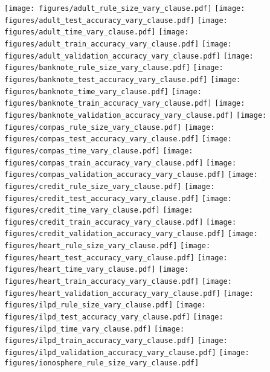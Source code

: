 \begin{figure*}[t]
\texttt{[image: figures/adult\_rule\_size\_vary\_clause.pdf]}
\texttt{[image: figures/adult\_test\_accuracy\_vary\_clause.pdf]}
\texttt{[image: figures/adult\_time\_vary\_clause.pdf]}
\texttt{[image: figures/adult\_train\_accuracy\_vary\_clause.pdf]}
\texttt{[image: figures/adult\_validation\_accuracy\_vary\_clause.pdf]}
\texttt{[image: figures/banknote\_rule\_size\_vary\_clause.pdf]}
\texttt{[image: figures/banknote\_test\_accuracy\_vary\_clause.pdf]}
\texttt{[image: figures/banknote\_time\_vary\_clause.pdf]}
\texttt{[image: figures/banknote\_train\_accuracy\_vary\_clause.pdf]}
\texttt{[image: figures/banknote\_validation\_accuracy\_vary\_clause.pdf]}
\texttt{[image: figures/compas\_rule\_size\_vary\_clause.pdf]}
\texttt{[image: figures/compas\_test\_accuracy\_vary\_clause.pdf]}
\texttt{[image: figures/compas\_time\_vary\_clause.pdf]}
\texttt{[image: figures/compas\_train\_accuracy\_vary\_clause.pdf]}
\texttt{[image: figures/compas\_validation\_accuracy\_vary\_clause.pdf]}
\texttt{[image: figures/credit\_rule\_size\_vary\_clause.pdf]}
\texttt{[image: figures/credit\_test\_accuracy\_vary\_clause.pdf]}
\texttt{[image: figures/credit\_time\_vary\_clause.pdf]}
\texttt{[image: figures/credit\_train\_accuracy\_vary\_clause.pdf]}
\texttt{[image: figures/credit\_validation\_accuracy\_vary\_clause.pdf]}
\texttt{[image: figures/heart\_rule\_size\_vary\_clause.pdf]}
\texttt{[image: figures/heart\_test\_accuracy\_vary\_clause.pdf]}
\texttt{[image: figures/heart\_time\_vary\_clause.pdf]}
\texttt{[image: figures/heart\_train\_accuracy\_vary\_clause.pdf]}
\texttt{[image: figures/heart\_validation\_accuracy\_vary\_clause.pdf]}
\texttt{[image: figures/ilpd\_rule\_size\_vary\_clause.pdf]}
\texttt{[image: figures/ilpd\_test\_accuracy\_vary\_clause.pdf]}
\texttt{[image: figures/ilpd\_time\_vary\_clause.pdf]}
\texttt{[image: figures/ilpd\_train\_accuracy\_vary\_clause.pdf]}
\texttt{[image: figures/ilpd\_validation\_accuracy\_vary\_clause.pdf]}
\texttt{[image: figures/ionosphere\_rule\_size\_vary\_clause.pdf]}

\end{figure*}
